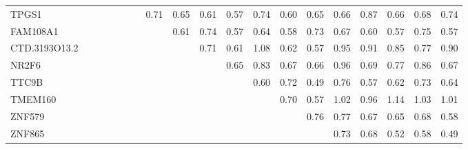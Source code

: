 \begin{longtable}{lrrrrrrrrrrrrrrrrrr}
TPGS1         &            &            &               &             &              &             &           0.71 &                0.65 &        0.61 &        0.57 &          0.74 &         0.60 &         0.65 &       0.66 &         0.87 &           0.66 &         0.68 &         0.74 \\
FAM108A1      &            &            &               &             &              &             &                &                0.61 &        0.74 &        0.57 &          0.64 &         0.58 &         0.73 &       0.67 &         0.60 &           0.57 &         0.75 &         0.57 \\
CTD.3193O13.2 &            &            &               &             &              &             &                &                     &        0.71 &        0.61 &          1.08 &         0.62 &         0.57 &       0.95 &         0.91 &           0.85 &         0.77 &         0.90 \\
NR2F6         &            &            &               &             &              &             &                &                     &             &        0.65 &          0.83 &         0.67 &         0.66 &       0.96 &         0.69 &           0.77 &         0.86 &         0.67 \\
TTC9B         &            &            &               &             &              &             &                &                     &             &             &          0.60 &         0.72 &         0.49 &       0.76 &         0.57 &           0.62 &         0.73 &         0.64 \\
TMEM160       &            &            &               &             &              &             &                &                     &             &             &               &         0.70 &         0.57 &       1.02 &         0.96 &           1.14 &         1.03 &         1.01 \\
ZNF579        &            &            &               &             &              &             &                &                     &             &             &               &              &         0.76 &       0.77 &         0.67 &           0.65 &         0.68 &         0.58 \\
ZNF865        &            &            &               &             &              &             &                &                     &             &             &               &              &              &       0.73 &         0.68 &           0.52 &         0.58 &         0.49 \\

\end{longtable}
